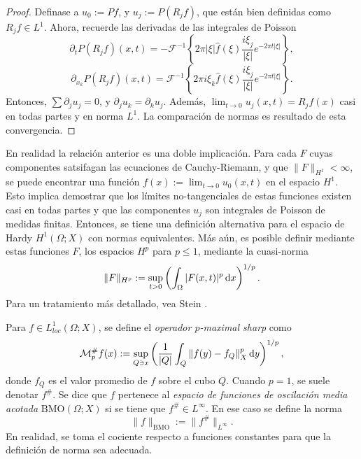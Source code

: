 \begin{proof}
	 Definase a $u_0 := Pf$, y $u_j := P(R_jf)$, que están bien definidas como $R_jf\in L^1$. Ahora, recuerde las derivadas de las integrales de Poisson
			\begin{equation*}
		\partial_t P(R_jf)(x, t) = -  \mathcal{F}^{-1}\left\{2\pi|\xi| \widehat{f}(\xi) \frac{i\xi_j}{|\xi|}e^{-2\pi t |\xi|} \right\},
	\end{equation*}
	\begin{equation*}
		\partial_{x_k} P(R_jf)(x, t) = \mathcal{F}^{-1}\left\{2\pi i\xi_k\widehat{f}(\xi) \frac{i\xi_j}{|\xi|}e^{-2\pi t |\xi|} \right\}.
	\end{equation*}
	Entonces, $\sum \partial_j u_j = 0$, y $\partial_j u_k = \partial_k u_j$. Además, $\lim_{t\to0}u_j(x, t) = R_jf(x)$ casi en todas partes y en norma $L^1$. La comparación de normas es resultado de esta convergencia.
\end{proof}
\begin{remark}
	En realidad la relación anterior es una doble implicación. Para cada $F$ cuyas componentes satsifagan las ecuaciones de Cauchy-Riemann, y que $\|F\|_{H^1}<\infty$, se puede encontrar una función $f(x):= \lim_{t\to0}u_0(x, t)$ en el espacio $H^1$. Esto implica demostrar que los límites no-tangenciales de estas funciones existen casi en todas partes y que las componentes $u_j$ son integrales de Poisson de medidas finitas. Entonces, se tiene una definición alternativa para el espacio de Hardy $H^1(\Omega;X)$ con normas equivalentes. Más aún, es posible definir mediante estas funciones $F$, los espacios $H^p$ para $p\leq1$, mediante la cuasi-norma
	\begin{equation*}
		\|F\|_{H^p} := \sup_{t>0} \left(\int_{\Omega} |F(x, t)|^p \mathop{}\!\mathrm{d} x\right)^{1/p}.
	\end{equation*}
	Para un tratamiento más detallado, vea Stein \cite{stein-singular}.
\end{remark}
\begin{definition}
	Para $f\in L^1_{loc}(\Omega; X)$, se define el \textit{operador $p$-maximal sharp} como
	\begin{equation*}
		\mathcal{M}_p^\#f(x) := \sup_{Q\ni x} \left( \frac{1}{|Q|}\int_Q \|f(y)-f_Q\|_X^p \mathop{}\!\mathrm{d} y\right)^{1/p},
	\end{equation*}
	donde $f_Q$ es el valor promedio de $f$ sobre el cubo $Q$. Cuando $p=1$, se suele denotar $f^\#$. Se dice que $f$ pertenece al \textit{espacio de funciones de oscilación media acotada} $\mathrm{BMO}(\Omega; X)$ si se tiene que $f^\# \in{L^\infty}$. En ese caso se define la norma
	\begin{equation*}
		\|f\|_{\mathrm{BMO}} := \| f^\#\|_{L^\infty}.
	\end{equation*}
	En realidad, se toma el cociente respecto a funciones constantes para que la definición de norma sea adecuada.
\end{definition}
